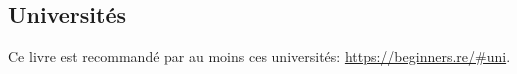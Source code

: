 \subsection*{Universités}

Ce livre est recommandé par au moins ces universités:
\url{https://beginners.re/\#uni}.

